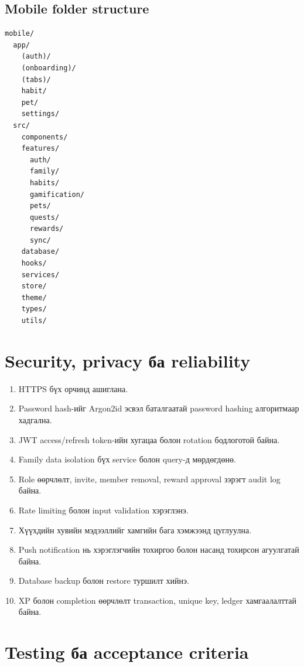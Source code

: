 \documentclass[12pt,a4paper,oneside]{report}
\begin{document}
\section{Mobile folder structure}
\begin{lstlisting}
mobile/
  app/
    (auth)/
    (onboarding)/
    (tabs)/
    habit/
    pet/
    settings/
  src/
    components/
    features/
      auth/
      family/
      habits/
      gamification/
      pets/
      quests/
      rewards/
      sync/
    database/
    hooks/
    services/
    store/
    theme/
    types/
    utils/
\end{lstlisting}

\chapter{Security, privacy ба reliability}

\begin{enumerate}
  \item HTTPS бүх орчинд ашиглана.
  \item Password hash-ийг Argon2id эсвэл баталгаатай password hashing алгоритмаар хадгална.
  \item JWT access/refresh token-ийн хугацаа болон rotation бодлоготой байна.
  \item Family data isolation бүх service болон query-д мөрдөгдөнө.
  \item Role өөрчлөлт, invite, member removal, reward approval зэрэгт audit log байна.
  \item Rate limiting болон input validation хэрэглэнэ.
  \item Хүүхдийн хувийн мэдээллийг хамгийн бага хэмжээнд цуглуулна.
  \item Push notification нь хэрэглэгчийн тохиргоо болон насанд тохирсон агуулгатай байна.
  \item Database backup болон restore туршилт хийнэ.
  \item XP болон completion өөрчлөлт transaction, unique key, ledger хамгаалалттай байна.
\end{enumerate}

\chapter{Testing ба acceptance criteria}
\end{document}
